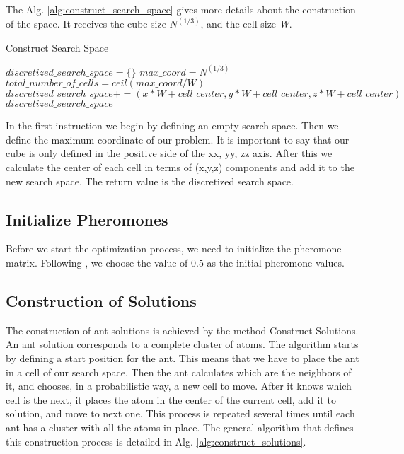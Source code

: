	
	\pagebreak
	The Alg. \ref{alg:construct_search_space} gives more details about the construction of the space. It receives the cube size $N^{(1/3)}$, and the cell size \emph{W}.
	
	\begin{algorithm}
		\caption{Construct Search Space}
		\label{alg:construct_search_space}
		\begin{algorithmic}
		\STATE $discretized\_search\_space = \{\}$
		\STATE $max\_coord = N^{(1/3)}$
		\STATE $total\_number\_of\_cells = ceil(max\_coord / W)$
					\STATE $discretized\_search\_space += (x * W + cell\_center,  y * W + cell\_center, z * W + cell\_center)$
				\ENDFOR
			\ENDFOR
		\ENDFOR
		\RETURN $discretized\_search\_space$
		\end{algorithmic}
	\end{algorithm}

	In the first instruction we begin by defining an empty search space. Then we define the maximum coordinate of our problem. It is important to say that our cube is only defined in the positive side of the xx, yy, zz axis. After this we calculate the center of each cell in terms of (x,y,z) components and add it to the new search space. 
	The return value is the discretized search space.
	
	\subsection{Initialize Pheromones}
	Before we start the optimization process, we need to initialize the pheromone matrix. Following \cite{blum04}, we choose the value of $0.5$ as the initial pheromone values.

	\subsection{Construction of Solutions}
	The construction of ant solutions is achieved by the method Construct Solutions. An ant solution corresponds to a complete cluster of atoms. The algorithm starts by defining a start position for the ant. This means that we have to place the ant in a cell of our search space. Then the ant calculates which are the neighbors of it, and chooses, in a probabilistic way, a new cell to move. After it knows which cell is the next, it places the atom in the center of the current cell, add it to solution, and move to next one. This process is repeated several times until each ant has a cluster with all the atoms in place. The general algorithm that defines this construction process is detailed in Alg. \ref{alg:construct_solutions}.
	
